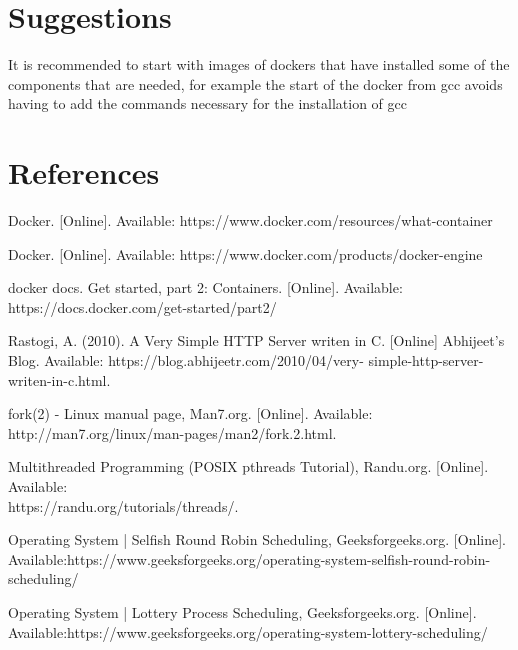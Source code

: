 \documentclass{article}
\begin{document}
\section{Suggestions}
It is recommended to start with images of dockers that have installed some of the components that are needed, for example the start of the docker from gcc avoids having to add the commands necessary for the installation of gcc
\section{References}
\begin{thebibliography}{1}

Docker. [Online]. Available: https://www.docker.com/resources/what-container

Docker. [Online]. Available: https://www.docker.com/products/docker-engine

docker docs. Get started, part 2: Containers. [Online]. Available: https://docs.docker.com/get-started/part2/

Rastogi, A. (2010). A Very Simple HTTP Server writen in C. [Online]
Abhijeet’s Blog. Available: https://blog.abhijeetr.com/2010/04/very-
simple-http-server-writen-in-c.html.

fork(2) - Linux manual page, Man7.org. [Online]. Available:
\\http://man7.org/linux/man-pages/man2/fork.2.html.

Multithreaded Programming (POSIX pthreads Tutorial), Randu.org. [Online]. Available: \\https://randu.org/tutorials/threads/. 

Operating System | Selfish Round Robin Scheduling, Geeksforgeeks.org. [Online]. Available:https://www.geeksforgeeks.org/operating-system-selfish-round-robin-scheduling/

Operating System | Lottery Process Scheduling, Geeksforgeeks.org. [Online]. Available:https://www.geeksforgeeks.org/operating-system-lottery-scheduling/


\end{thebibliography}
\end{document}

